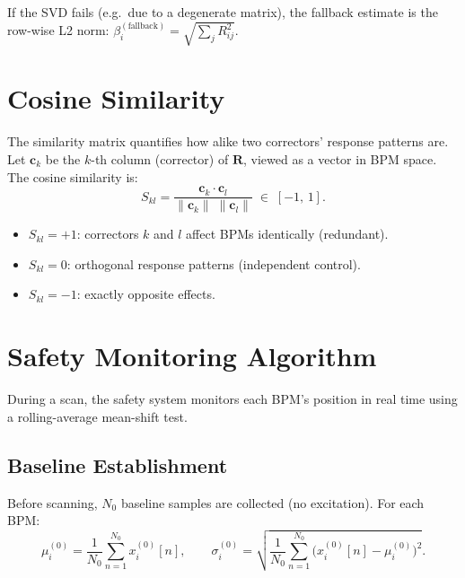 \documentclass[11pt,a4paper,twoside]{report}
\begin{document}
\begin{notebox}
If the SVD fails (e.g.\ due to a degenerate matrix), the fallback estimate is the row-wise L2 norm:
$\beta_i^{(\text{fallback})} = \sqrt{\sum_j R_{ij}^2}$.
\end{notebox}

\section{Cosine Similarity}\label{sec:similarity}

The similarity matrix quantifies how alike two correctors' response patterns are. Let $\mathbf{c}_k$ be the $k$-th column (corrector) of $\mathbf{R}$, viewed as a vector in BPM space. The cosine similarity is:
\begin{equation}\label{eq:cossim}
  S_{kl}
  = \frac{\mathbf{c}_k \cdot \mathbf{c}_l}
         {\lVert\mathbf{c}_k\rVert\;\lVert\mathbf{c}_l\rVert}
  \;\in\;[-1,\,1].
\end{equation}

\begin{itemize}
  \item $S_{kl}=+1$: correctors $k$ and $l$ affect BPMs identically (redundant).
  \item $S_{kl}=0$: orthogonal response patterns (independent control).
  \item $S_{kl}=-1$: exactly opposite effects.
\end{itemize}

\section{Safety Monitoring Algorithm}\label{sec:safety-algo}

During a scan, the safety system monitors each BPM's position in real time using a rolling-average mean-shift test.

\subsection{Baseline Establishment}

Before scanning, $N_0$ baseline samples are collected (no excitation). For each BPM:
\begin{equation}
  \mu_i^{(0)} = \frac{1}{N_0}\sum_{n=1}^{N_0} x_i^{(0)}[n],
  \qquad
  \sigma_i^{(0)} = \sqrt{\frac{1}{N_0}\sum_{n=1}^{N_0}
    \bigl(x_i^{(0)}[n]-\mu_i^{(0)}\bigr)^{2}}.
\end{equation}
\end{document}

